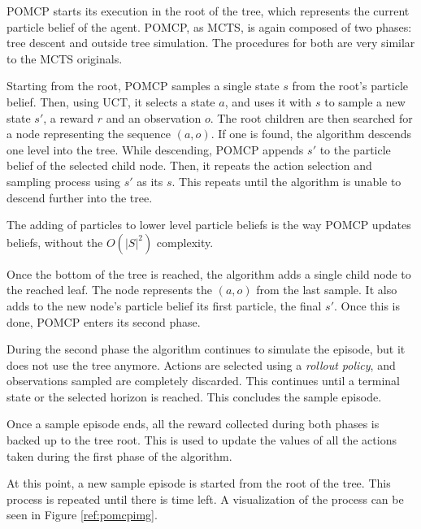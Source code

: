 POMCP starts its execution in the root of the tree, which represents the current particle
belief of the agent. POMCP, as MCTS, is again composed of two phases: tree descent and outside tree
simulation. The procedures for both are very similar to the MCTS originals.

Starting from the root, POMCP samples a single state $s$ from the root's particle belief. Then,
using UCT, it selects a state $a$, and uses it with $s$ to sample a new state $s'$, a reward $r$ and
an observation $o$. The root children are then searched for a node representing the sequence
$(a,o)$. If one is found, the algorithm descends one level into the tree. While descending, POMCP
appends $s'$ to the particle belief of the selected child node. Then, it repeats the action
selection and sampling process using $s'$ as its $s$. This repeats until the algorithm is unable to
descend further into the tree.

The adding of particles to lower level particle beliefs is the way POMCP updates beliefs, without
the $O(|S|^2)$ complexity.

Once the bottom of the tree is reached, the algorithm adds a single child node to the reached leaf.
The node represents the $(a,o)$ from the last sample. It also adds to the new node's particle belief
its first particle, the final $s'$. Once this is done, POMCP enters its second phase.

During the second phase the algorithm continues to simulate the episode, but it does not use the
tree anymore. Actions are selected using a \textit{rollout policy}, and observations sampled are
completely discarded. This continues until a terminal state or the selected horizon is reached. This
concludes the sample episode.

Once a sample episode ends, all the reward collected during both phases is backed up to the tree
root. This is used to update the values of all the actions taken during the first phase of the
algorithm.

At this point, a new sample episode is started from the root of the tree. This process is repeated until there is time left. A visualization of the process can be seen in Figure \ref{ref:pomcpimg}.

